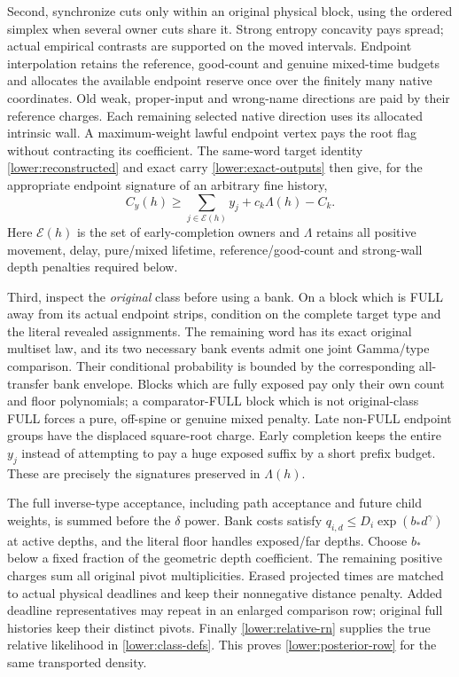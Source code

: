 Second, synchronize cuts only within an original physical block,
using the ordered simplex when several owner cuts share it.  Strong
entropy concavity pays spread; actual empirical contrasts are supported
on the moved intervals.  Endpoint interpolation retains the reference,
good-count and genuine mixed-time budgets and allocates the available
endpoint reserve once over the finitely many native coordinates.
Old weak, proper-input and wrong-name directions are paid by their
reference charges.  Each remaining selected native direction uses
its allocated intrinsic wall.  A maximum-weight lawful endpoint
vertex pays the root flag without contracting its coefficient.
The same-word target identity \eqref{lower:reconstructed} and exact
carry \eqref{lower:exact-outputs} then give, for the appropriate
endpoint signature of an arbitrary fine history,
\[
 C_y(h)\geq\sum_{j\in\mathcal E(h)}y_j+c_k\Lambda(h)-C_k.
\]
Here $\mathcal E(h)$ is the set of early-completion owners and
$\Lambda$ retains all positive movement, delay, pure/mixed lifetime,
reference/good-count and strong-wall depth penalties required below.

Third, inspect the \emph{original} class before using a bank.  On a
block which is FULL away from its actual endpoint strips, condition
on the complete target type and the literal revealed assignments.
The remaining word has its exact original multiset law, and its two
necessary bank events admit one joint Gamma/type comparison.
Their conditional probability is bounded by the corresponding
all-transfer bank envelope.  Blocks which are fully exposed pay
only their own count and floor polynomials; a comparator-FULL block
which is not original-class FULL forces a pure, off-spine or genuine
mixed penalty.  Late non-FULL endpoint groups have the displaced
square-root charge.  Early completion keeps the entire $y_j$ instead
of attempting to pay a huge exposed suffix by a short prefix budget.
These are precisely the signatures preserved in $\Lambda(h)$.

The full inverse-type acceptance, including path acceptance and future
child weights, is summed before the $\delta$ power.  Bank costs satisfy
$q_{i,d}\leq D_i\exp(b_*d^\gamma)$ at active depths, and the literal
floor handles exposed/far depths.  Choose $b_*$ below a fixed fraction
of the geometric depth coefficient.  The remaining positive charges
sum all original pivot multiplicities.  Erased projected times are
matched to actual physical deadlines and keep their nonnegative
distance penalty.  Added deadline representatives may repeat in an
enlarged comparison row; original full histories keep their distinct
pivots.  Finally \eqref{lower:relative-rn} supplies the true relative
likelihood in \eqref{lower:class-defs}.  This proves
\eqref{lower:posterior-row} for the same transported density.

